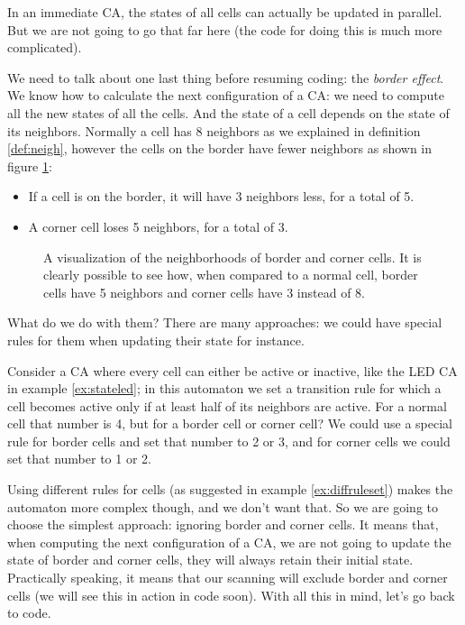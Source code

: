 In an immediate CA, the states of all cells can actually be updated in parallel. But we are not going to go
that far here (the code for doing this is much more complicated).

We need to talk about one last thing before resuming coding: the \textit{border effect}. We know how to
calculate the next configuration of a CA: we need to compute all the new states of all the cells. And the state
of a cell depends on the state of its neighbors. Normally a cell has 8 neighbors as we explained in definition
\ref{def:neigh}, however the cells on the border have fewer neighbors as shown in figure \ref{fig:bordercells}:

\begin{itemize}
\item If a cell is on the border, it will have 3 neighbors less, for a total of 5.
\item A corner cell loses 5 neighbors, for a total of 3.
\end{itemize}

%
\begin{figure}[b]
\sidecaption

%
%
\caption{A visualization of the neighborhoods of border and corner cells.
It is clearly possible to see how, when compared to a normal cell, border cells have 5 neighbors and
corner cells have 3 instead of 8.}
\label{fig:bordercells}
\end{figure}
%

What do we do with them? There are many approaches: we could have special rules for them when updating their
state for instance.

\begin{example}
\label{ex:diffruleset}
Consider a CA where every cell can either be active or inactive, like the LED CA in
example \ref{ex:stateled}; in this automaton we set a transition rule for which 
a cell becomes active only if at least half of its neighbors are active. For a
normal cell that number is 4, but for a border cell or corner cell? We could use a special rule for border
cells and set that number to 2 or 3, and for corner cells we could set that number to 1 or 2.
\end{example}

Using different rules for cells (as suggested in example \ref{ex:diffruleset})
makes the automaton more complex though, and we don't want that.
So we are going to
choose the simplest approach: ignoring border and corner cells. It means that, when computing the next
configuration of a CA, we are not going to update the state of border and corner cells, they will always retain their initial state. Practically speaking, it means that our scanning will exclude border and corner cells
(we will see this in action in code soon). With all this in mind, let's go back to code.

